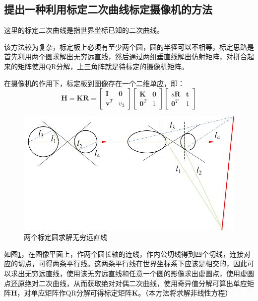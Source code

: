 \documentclass[11pt]{article}
\begin{document}
\subsection{提出一种利用标定二次曲线标定摄像机的方法}
这里的标定二次曲线是指世界坐标已知的二次曲线。\par
该方法较为复杂，标定板上必须有至少两个圆，圆的半径可以不相等，标定思路是首先利用两个圆求解出无穷远直线，然后通过两组垂直线解出仿射矩阵，对拼合起来的矩阵使用QR分解，上三角阵就是待标定的摄像机矩阵。\par
在摄像机的作用下，标定板到图像存在一个二维单应，即：
\begin{equation}
  \mathbf{H=KR}=\begin{bmatrix}
    \mathbf{I}   & \mathbf{0} \\
    \mathbf{v}^T & v_3
  \end{bmatrix}\begin{bmatrix}
    \mathbf{K}   & \mathbf{0} \\
    \mathbf{0}^T & 1
  \end{bmatrix}\begin{bmatrix}
    s\mathbf{R}  & \mathbf{t} \\
    \mathbf{0}^T & 1
  \end{bmatrix}
  \label{eq:标定板到图像的二维单应}
\end{equation}\par
\begin{figure}[H]
  \centering
  \includegraphics[width=0.8\linewidth]{练习题5.png}
  \caption{两个标定圆求解无穷远直线}
  \label{fig:两个标定圆求解无穷远直线}
\end{figure}\par
如图\ref{fig:两个标定圆求解无穷远直线}，在图像平面上，作两个圆长轴的连线，作内公切线得到四个切线，连接对应的切点，可得两条平行线。这两条平行线在世界坐标系下应该是相交的，因此可以求出无穷远直线，使用该无穷远直线和任意一个圆的影像求出虚圆点，使用虚圆点还原绝对二次曲线，从而获取绝对对偶二次曲线，使用奇异值分解可算出单应矩阵$\mathbf{H}$，对单应矩阵作QR分解可得标定矩阵$\mathbf{K}$。（本方法将求解非线性方程）\par
\end{document}
